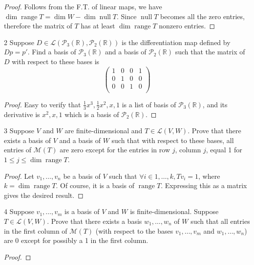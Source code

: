 \documentclass{extarticle}
\newenvironment{problem}[1]{\begin{prob*}{#1}{}}{\end{prob*}}
\DeclareMathOperator{\Null}{null}
\DeclareMathOperator{\Range}{range}
\begin{document}
\begin{proof}
Follows from the F.T. of linear maps, we have \(\dim \Range T = \dim W - \dim \Null T\).
Since $\Null T$ becomes all the zero entries, therefore
the matrix of $T$ has at least $\dim \Range T$ nonzero entries.
\end{proof}

\begin{problem}{2}
Suppose $D \in \mathcal{L}(\mathcal{P}_3(\mathbb{R}), \mathcal{P}_2(\mathbb{R}))$ is the differentiation map defined by $Dp = p\prime$. Find a basis of $\mathcal{P}_3(\mathbb{R})$
and a basis of $\mathcal{P}_2(\mathbb{R})$ such that the matrix of $D$ with respect to these bases is
\[
  \begin{pmatrix} 1 & 0 & 0 & 1 \\ 0 & 1 & 0 & 0 \\ 0 & 0 & 1 & 0 \\\end{pmatrix}\]
\end{problem}
\begin{proof}
Easy to verify that $\frac{1}{3}x^3, \frac{1}{2}x^2, x, 1$ is a list of basis
of $\mathcal{P}_3(\mathbb{R})$, and its derivative is $x^2, x, 1$ which is a basis of $\mathcal{P}_2(\mathbb{R})$.
\end{proof}

\begin{problem}{3}
Suppose $V$ and $W$ are finite-dimensional and $T \in \mathcal{L}(V,W)$. Prove that there exists a basis of $V$ and a basis of $W$ such that with respect to these bases, all entries of $\mathcal{M}(T)$ are zero except for the entries in row $j$, column $j$, equal 1 for $1 \le j \le \operatorname{dim}\Range T$.
\end{problem}

\begin{proof}
Let $v_1, \ldots , v_n$ be a basis of $V$ such that $\forall i \in {1, \ldots, k}, Tv_i = 1$,
where $k = \operatorname{dim}\Range T$.
Of course, it is a basis of $\Range T$. Expressing this as a matrix gives the desired result.
\end{proof}

\begin{problem}{4}
Suppose $v_1, \ldots ,v_m$ is a basis of $V$ and $W$ is finite-dimensional.
Suppose $T \in \mathcal{L}(V,W)$. Prove that there exists a basis $w_1, \ldots ,w_n$
of $W$ such that all entries in the first column of $\mathcal{M}(T)$ (with respect to
the bases $v_1, \ldots ,v_m$ and $w_1, \ldots ,w_n$) are 0 except for possibly a 1 in
the first column.
\end{problem}
\begin{proof}

\end{proof}

\end{document}
